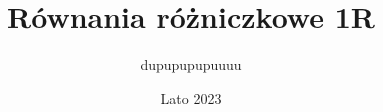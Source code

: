 \documentclass{article}
\title{Równania różniczkowe 1R}
\author{dupupupupuuuu}
\date{Lato 2023}
\begin{document}
\maketit

\tableofcontents
\newpage


\newpage


\end{document}
